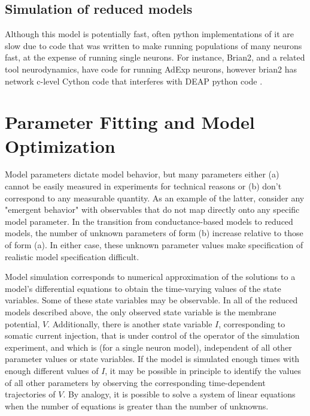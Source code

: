 
\subsection{Simulation of reduced models}
Although this model is potentially fast, often python implementations of it are slow due to code that was written to make running populations of many neurons fast, at the expense of running single neurons. 
For instance, Brian2, and a related tool neurodynamics, have code for running AdExp neurons, however brian2 has network c-level Cython code that interferes with DEAP python code \citep{DEAP_JMLR2012}.
\\
\section{Parameter Fitting and Model Optimization}
Model parameters dictate model behavior, but many parameters either (a) cannot be easily measured in experiments for technical reasons or (b) don't correspond to any measurable quantity.
As an example of the latter, consider any "emergent behavior" with observables that do not map directly onto any specific model parameter.
In the transition from conductance-based models to reduced models, the number of unknown parameters of form (b) increase relative to those of form (a).
In either case, these unknown parameter values make specification of realistic model specification difficult.

Model simulation corresponds to numerical approximation of the solutions to a model's differential equations to obtain the time-varying values of the state variables.
Some of these state variables may be observable.
In all of the reduced models described above, the only observed state variable is the membrane potential, $V$.
Additionally, there is another state variable $I$, corresponding to somatic current injection, that is under control of the operator of the simulation experiment, and which is (for a single neuron model), independent of all other parameter values or state variables.
If the model is simulated enough times with enough different values of $I$, it may be possible in principle to identify the values of all other parameters by observing the corresponding time-dependent trajectories of $V$.
By analogy, it is possible to solve a system of linear equations when the number of equations is greater than the number of unknowns.

